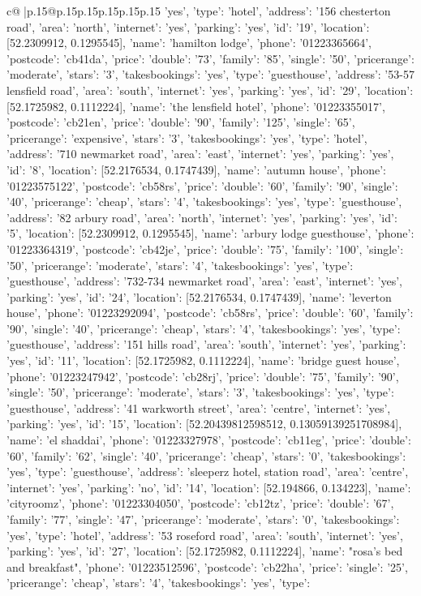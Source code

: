 \documentclass{article}
\begin{document}
{\begin{supertabular}{c@{$\;$}|p{.15\linewidth}@{}p{.15\linewidth}p{.15\linewidth}p{.15\linewidth}p{.15\linewidth}p{.15\linewidth}}
{{{'yes', 'type': 'hotel'}, {'address': '156 chesterton road', 'area': 'north', 'internet': 'yes', 'parking': 'yes', 'id': '19', 'location': [52.2309912, 0.1295545], 'name': 'hamilton lodge', 'phone': '01223365664', 'postcode': 'cb41da', 'price': {'double': '73', 'family': '85', 'single': '50'}, 'pricerange': 'moderate', 'stars': '3', 'takesbookings': 'yes', 'type': 'guesthouse'}, {'address': '53-57 lensfield road', 'area': 'south', 'internet': 'yes', 'parking': 'yes', 'id': '29', 'location': [52.1725982, 0.1112224], 'name': 'the lensfield hotel', 'phone': '01223355017', 'postcode': 'cb21en', 'price': {'double': '90', 'family': '125', 'single': '65'}, 'pricerange': 'expensive', 'stars': '3', 'takesbookings': 'yes', 'type': 'hotel'}, {'address': '710 newmarket road', 'area': 'east', 'internet': 'yes', 'parking': 'yes', 'id': '8', 'location': [52.2176534, 0.1747439], 'name': 'autumn house', 'phone': '01223575122', 'postcode': 'cb58rs', 'price': {'double': '60', 'family': '90', 'single': '40'}, 'pricerange': 'cheap', 'stars': '4', 'takesbookings': 'yes', 'type': 'guesthouse'}, {'address': '82 arbury road', 'area': 'north', 'internet': 'yes', 'parking': 'yes', 'id': '5', 'location': [52.2309912, 0.1295545], 'name': 'arbury lodge guesthouse', 'phone': '01223364319', 'postcode': 'cb42je', 'price': {'double': '75', 'family': '100', 'single': '50'}, 'pricerange': 'moderate', 'stars': '4', 'takesbookings': 'yes', 'type': 'guesthouse'}, {'address': '732-734 newmarket road', 'area': 'east', 'internet': 'yes', 'parking': 'yes', 'id': '24', 'location': [52.2176534, 0.1747439], 'name': 'leverton house', 'phone': '01223292094', 'postcode': 'cb58rs', 'price': {'double': '60', 'family': '90', 'single': '40'}, 'pricerange': 'cheap', 'stars': '4', 'takesbookings': 'yes', 'type': 'guesthouse'}, {'address': '151 hills road', 'area': 'south', 'internet': 'yes', 'parking': 'yes', 'id': '11', 'location': [52.1725982, 0.1112224], 'name': 'bridge guest house', 'phone': '01223247942', 'postcode': 'cb28rj', 'price': {'double': '75', 'family': '90', 'single': '50'}, 'pricerange': 'moderate', 'stars': '3', 'takesbookings': 'yes', 'type': 'guesthouse'}, {'address': '41 warkworth street', 'area': 'centre', 'internet': 'yes', 'parking': 'yes', 'id': '15', 'location': [52.20439812598512, 0.13059139251708984], 'name': 'el shaddai', 'phone': '01223327978', 'postcode': 'cb11eg', 'price': {'double': '60', 'family': '62', 'single': '40'}, 'pricerange': 'cheap', 'stars': '0', 'takesbookings': 'yes', 'type': 'guesthouse'}, {'address': 'sleeperz hotel, station road', 'area': 'centre', 'internet': 'yes', 'parking': 'no', 'id': '14', 'location': [52.194866, 0.134223], 'name': 'cityroomz', 'phone': '01223304050', 'postcode': 'cb12tz', 'price': {'double': '67', 'family': '77', 'single': '47'}, 'pricerange': 'moderate', 'stars': '0', 'takesbookings': 'yes', 'type': 'hotel'}, {'address': '53 roseford road', 'area': 'south', 'internet': 'yes', 'parking': 'yes', 'id': '27', 'location': [52.1725982, 0.1112224], 'name': "rosa's bed and breakfast", 'phone': '01223512596', 'postcode': 'cb22ha', 'price': {'single': '25'}, 'pricerange': 'cheap', 'stars': '4', 'takesbookings': 'yes', 'type': }}}
\end{supertabular}}
\end{document}

